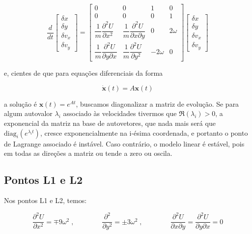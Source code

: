 \begin{equation}
\frac{d}{dt}
  \begin{bmatrix}
    \delta x \\
    \delta y \\
    \delta v_x \\
    \delta v_y
 \end{bmatrix}
=
 \begin{bmatrix}
   0 & 0 & 1 & 0 \\
   0 & 0 & 0 & 1 \\
   \dfrac{1}{m} \dfrac{\partial ^2U}{\partial x^2} & \dfrac{1}{m} \dfrac{\partial ^2U}{\partial x\partial y} & 0 & 2\omega \\
   \dfrac{1}{m} \dfrac{\partial ^2U}{\partial y \partial x} & \dfrac{1}{m} \dfrac{\partial ^2U}{\partial y^2} & -2\omega & 0
 \end{bmatrix}
   \begin{bmatrix}
    \delta x \\
    \delta y \\
    \delta v_x \\
    \delta v_y
 \end{bmatrix}
\end{equation}

e, cientes de que para equações diferenciais da forma

\begin{equation}
    \dot{\mathbf{x}}(t) = A\mathbf{x}(t)
\end{equation}

a solução é $\mathbf{x}(t) = e^{At}$, buscamos diagonalizar a matriz de evolução. Se para algum autovalor $\lambda_i$ associado às velocidades tivermos que $\Re(\lambda_i) > 0$, a exponencial da matriz na base de autovetores, que nada mais será que $\text{diag}_i(e^{\lambda_i t})$, cresce exponencialmente na i-ésima coordenada, e portanto o ponto de Lagrange associado é instável. Caso contrário, o modelo linear é estável, pois em todas as direções a matriz ou tende a zero ou oscila.

\subsection{Pontos L1 e L2}

Nos pontos L1 e L2, temos:

\begin{equation}
\dfrac{\partial ^2U}{\partial x^2} = \mp 9\omega^2 \;, \qquad \qquad \dfrac{\partial ^2}{\partial y^2} = \pm 3\omega^2 \;, \qquad \qquad \dfrac{\partial ^2U}{\partial x\partial y} = \dfrac{\partial ^2U}{\partial y\partial x} = 0
\end{equation}

